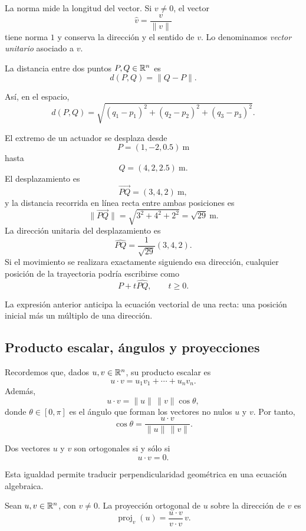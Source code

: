 La norma mide la longitud del vector. Si $v\neq0$, el vector
\[
\widehat v=\frac{v}{\|v\|}
\]
tiene norma $1$ y conserva la dirección y el sentido de $v$. Lo denominamos \emph{vector unitario} asociado a $v$.

\begin{definition}
La distancia entre dos puntos $P,Q\in\mathbb{R}^n$ es
\[
d(P,Q)=\|Q-P\|.
\]
\end{definition}

Así, en el espacio,
\[
d(P,Q)
=\sqrt{(q_1-p_1)^2+(q_2-p_2)^2+(q_3-p_3)^2}.
\]

\begin{example}
El extremo de un actuador se desplaza desde
\[
P=(1,-2,0.5)\ \mathrm{m}
\]
hasta
\[
Q=(4,2,2.5)\ \mathrm{m}.
\]
El desplazamiento es
\[
\overrightarrow{PQ}=(3,4,2)\ \mathrm{m},
\]
y la distancia recorrida en línea recta entre ambas posiciones es
\[
\|\overrightarrow{PQ}\|
=\sqrt{3^2+4^2+2^2}
=\sqrt{29}\ \mathrm{m}.
\]
La dirección unitaria del desplazamiento es
\[
\widehat{PQ}=\frac{1}{\sqrt{29}}(3,4,2).
\]
Si el movimiento se realizara exactamente siguiendo esa dirección, cualquier posición de la trayectoria podría escribirse como
\[
P+t\widehat{PQ},\qquad t\geq0.
\]
\end{example}

La expresión anterior anticipa la ecuación vectorial de una recta: una posición inicial más un múltiplo de una dirección.

\subsection{Producto escalar, ángulos y proyecciones}

Recordemos que, dados $u,v\in\mathbb{R}^n$, su producto escalar es
\[
u\cdot v=u_1v_1+\cdots+u_nv_n.
\]
Además,
\[
u\cdot v=\|u\|\,\|v\|\cos\theta,
\]
donde $\theta\in[0,\pi]$ es el ángulo que forman los vectores no nulos $u$ y $v$. Por tanto,
\[
\cos\theta=\frac{u\cdot v}{\|u\|\,\|v\|}.
\]

\begin{proposition}
Dos vectores $u$ y $v$ son ortogonales si y sólo si
\[
u\cdot v=0.
\]
\end{proposition}

Esta igualdad permite traducir perpendicularidad geométrica en una ecuación algebraica.

\begin{definition}
Sean $u,v\in\mathbb{R}^n$, con $v\neq0$. La proyección ortogonal de $u$ sobre la dirección de $v$ es
\[
\operatorname{proj}_v(u)
=\frac{u\cdot v}{v\cdot v}\,v.
\]
\end{definition}

